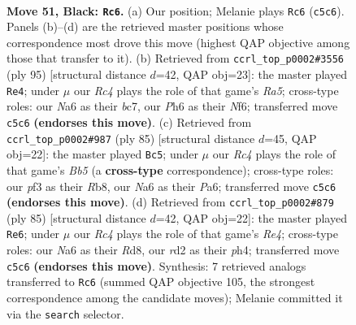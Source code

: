 \documentclass[11pt]{article}
\begin{document}
\clearpage

\begin{figure}[p]\centering
\begin{subfigure}{0.46\textwidth}\centering
\resizebox{\linewidth}{!}{%
\newchessgame
\chessboard[
  setfen={8/1p2p1k1/n5pp/p1r5/P1p2K2/N1P2P2/1B1R4/8 b - - 8 51},
  showmover=false,
  pgfstyle=straightmove, color=movearrow, markmove={c5-c6}
]}
\caption{}
\end{subfigure}\hfill
\begin{subfigure}{0.46\textwidth}\centering
\resizebox{\linewidth}{!}{%
\newchessgame
\chessboard[
  setfen={8/2B2pkp/5n2/2p2P2/r6p/3p4/6P1/4RBK1 b - - 0 48},
  showmover=false,
  pgfstyle=straightmove, color=movearrow, markmove={a4-e4}
]}
\caption{}
\end{subfigure}
\\[4pt]
\begin{subfigure}{0.46\textwidth}\centering
\resizebox{\linewidth}{!}{%
\newchessgame
\chessboard[
  setfen={1r6/5pk1/p2p3p/3P3p/PbN5/1p1BR3/5PK1/8 b - - 5 43},
  showmover=false,
  pgfstyle=straightmove, color=movearrow, markmove={b4-c5}
]}
\caption{}
\end{subfigure}\hfill
\begin{subfigure}{0.46\textwidth}\centering
\resizebox{\linewidth}{!}{%
\newchessgame
\chessboard[
  setfen={3r4/5pk1/6p1/1p2r3/1P2p1PP/p3N3/P1B1K3/7R b - - 2 43},
  showmover=false,
  pgfstyle=straightmove, color=movearrow, markmove={e5-e6}
]}
\caption{}
\end{subfigure}
\caption{\textbf{Move 51, Black: \texttt{Rc6}.} (a) Our position; Melanie plays \texttt{Rc6} (\texttt{c5c6}). Panels (b)--(d) are the retrieved master positions whose correspondence most drove this move (highest QAP objective among those that transfer to it). (b) Retrieved from \texttt{ccrl\_top\_p0002\#3556} (ply 95) [structural distance $d$=42, QAP obj=23]: the master played \texttt{Re4}; under $\mu$ our \emph{Rc4} plays the role of that game's \emph{Ra5}; cross-type roles: our \emph{N}a6 as their \emph{b}c7, our \emph{P}h6 as their \emph{N}f6; transferred move \texttt{c5c6} \textbf{(endorses this move)}. (c) Retrieved from \texttt{ccrl\_top\_p0002\#987} (ply 85) [structural distance $d$=45, QAP obj=22]: the master played \texttt{Bc5}; under $\mu$ our \emph{Rc4} plays the role of that game's \emph{Bb5} (a \textbf{cross-type} correspondence); cross-type roles: our \emph{p}f3 as their \emph{R}b8, our \emph{N}a6 as their \emph{P}a6; transferred move \texttt{c5c6} \textbf{(endorses this move)}. (d) Retrieved from \texttt{ccrl\_top\_p0002\#879} (ply 85) [structural distance $d$=42, QAP obj=22]: the master played \texttt{Re6}; under $\mu$ our \emph{Rc4} plays the role of that game's \emph{Re4}; cross-type roles: our \emph{N}a6 as their \emph{R}d8, our \emph{r}d2 as their \emph{p}h4; transferred move \texttt{c5c6} \textbf{(endorses this move)}. Synthesis: 7 retrieved analogs transferred to \texttt{Rc6} (summed QAP objective 105, the strongest correspondence among the candidate moves); Melanie committed it via the \texttt{search} selector.}
\label{fig:thought-m101}
\end{figure}
\end{document}

